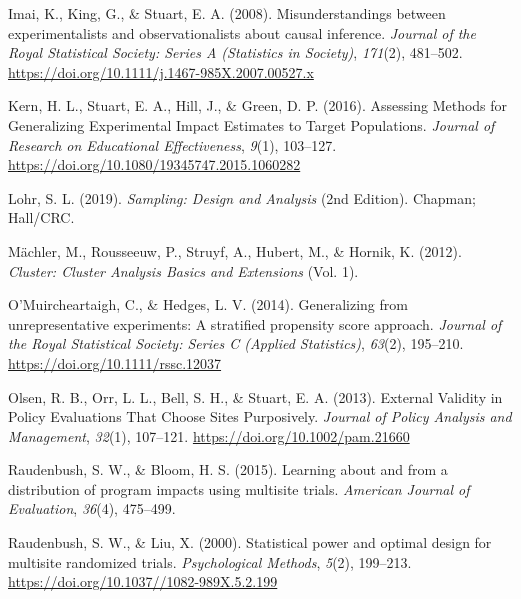\documentclass[
  english,
  man,floatsintext]{apa6}
\newlength{\cslhangindent}
\newlength{\cslentryspacingunit} %
\newenvironment{CSLReferences}[2] %
 {%
  \setlength{\parindent}{0pt}
  \ifodd #1
  \let\oldpar\par
  \def\par{\hangindent=\cslhangindent\oldpar}
  \fi
  \setlength{\parskip}{#2\cslentryspacingunit}
 }%
 {}
\begin{document}
\begin{CSLReferences}{1}{0}
\leavevmode{}%
Imai, K., King, G., \& Stuart, E. A. (2008). Misunderstandings between experimentalists and observationalists about causal inference. \emph{Journal of the Royal Statistical Society: Series A (Statistics in Society)}, \emph{171}(2), 481--502. \url{https://doi.org/10.1111/j.1467-985X.2007.00527.x}

\leavevmode{}%
Kern, H. L., Stuart, E. A., Hill, J., \& Green, D. P. (2016). Assessing {Methods} for {Generalizing Experimental Impact Estimates} to {Target Populations}. \emph{Journal of Research on Educational Effectiveness}, \emph{9}(1), 103--127. \url{https://doi.org/10.1080/19345747.2015.1060282}

\leavevmode{}%
Lohr, S. L. (2019). \emph{Sampling: {Design} and {Analysis}} (2nd Edition). Chapman; Hall/CRC.

\leavevmode{}%
Mächler, M., Rousseeuw, P., Struyf, A., Hubert, M., \& Hornik, K. (2012). \emph{Cluster: {Cluster Analysis Basics} and {Extensions}} (Vol. 1).

\leavevmode{}%
O'Muircheartaigh, C., \& Hedges, L. V. (2014). Generalizing from unrepresentative experiments: A stratified propensity score approach. \emph{Journal of the Royal Statistical Society: Series C (Applied Statistics)}, \emph{63}(2), 195--210. \url{https://doi.org/10.1111/rssc.12037}

\leavevmode{}%
Olsen, R. B., Orr, L. L., Bell, S. H., \& Stuart, E. A. (2013). External {Validity} in {Policy Evaluations That Choose Sites Purposively}. \emph{Journal of Policy Analysis and Management}, \emph{32}(1), 107--121. \url{https://doi.org/10.1002/pam.21660}

\leavevmode{}%
Raudenbush, S. W., \& Bloom, H. S. (2015). Learning about and from a distribution of program impacts using multisite trials. \emph{American Journal of Evaluation}, \emph{36}(4), 475--499.

\leavevmode{}%
Raudenbush, S. W., \& Liu, X. (2000). Statistical power and optimal design for multisite randomized trials. \emph{Psychological Methods}, \emph{5}(2), 199--213. \url{https://doi.org/10.1037//1082-989X.5.2.199}


\end{CSLReferences}
\end{document}
